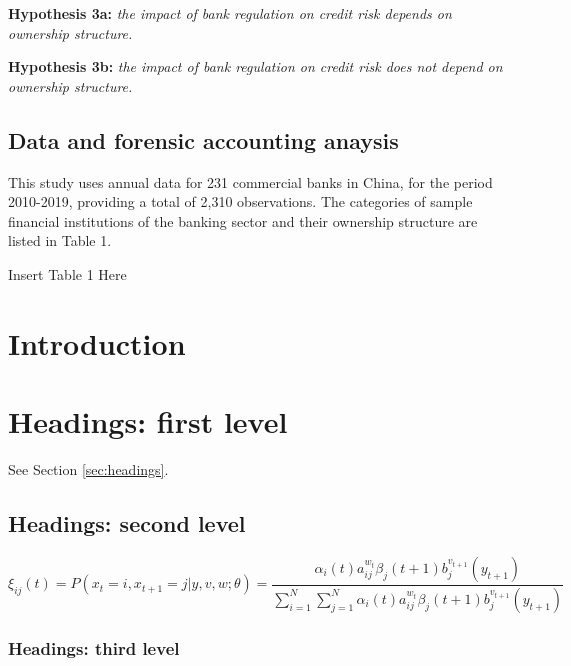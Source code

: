 \documentclass{article}
\begin{document}
\textbf{Hypothesis 3a:} \emph{the impact of bank regulation on credit
risk depends on ownership structure.}

\textbf{Hypothesis 3b:} \emph{the impact of bank regulation on credit
risk does not depend on ownership structure.}

\hypertarget{data-and-forensic-accounting-anaysis}{%
\subsection{Data and forensic accounting
anaysis}\label{data-and-forensic-accounting-anaysis}}

This study uses annual data for 231 commercial banks in China, for the
period 2010-2019, providing a total of 2,310 observations. The
categories of sample financial institutions of the banking sector and
their ownership structure are listed in Table 1.

\begin{center}
    {Insert Table 1 Here}
\end{center}

\hypertarget{introduction-1}{%
\section{Introduction}\label{introduction-1}}

\lipsum[2]
\lipsum[3]

\hypertarget{headings-first-level}{%
\section{Headings: first level}\label{headings-first-level}}

\lipsum[4] See Section \ref{sec:headings}.

\hypertarget{headings-second-level}{%
\subsection{Headings: second level}\label{headings-second-level}}

\lipsum[5]

\[
\xi _{ij}(t)=P(x_{t}=i,x_{t+1}=j|y,v,w;\theta)= {\frac {\alpha _{i}(t)a^{w_t}_{ij}\beta _{j}(t+1)b^{v_{t+1}}_{j}(y_{t+1})}{\sum _{i=1}^{N} \sum _{j=1}^{N} \alpha _{i}(t)a^{w_t}_{ij}\beta _{j}(t+1)b^{v_{t+1}}_{j}(y_{t+1})}}
\]

\hypertarget{headings-third-level}{%
\subsubsection{Headings: third level}\label{headings-third-level}}
\end{document}
